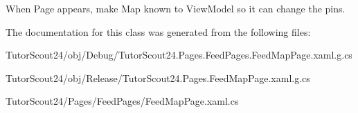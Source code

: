 When Page appears, make Map known to View\+Model so it can change the pins. 



The documentation for this class was generated from the following files\+:\begin{DoxyCompactItemize}
\item 
Tutor\+Scout24/obj/\+Debug/Tutor\+Scout24.\+Pages.\+Feed\+Pages.\+Feed\+Map\+Page.\+xaml.\+g.\+cs\item 
Tutor\+Scout24/obj/\+Release/Tutor\+Scout24.\+Pages.\+Feed\+Map\+Page.\+xaml.\+g.\+cs\item 
Tutor\+Scout24/\+Pages/\+Feed\+Pages/Feed\+Map\+Page.\+xaml.\+cs\end{DoxyCompactItemize}
